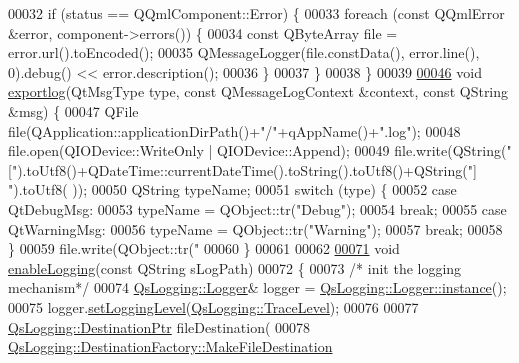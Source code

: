 \begin{DoxyCode}
00032     \textcolor{keywordflow}{if} (status == QQmlComponent::Error) \{
00033         \textcolor{keywordflow}{foreach} (\textcolor{keyword}{const} QQmlError &error, component->errors()) \{
00034             \textcolor{keyword}{const} QByteArray file = error.url().toEncoded();
00035             QMessageLogger(file.constData(), error.line(), 0).debug() << error.description();
00036         \}
00037     \}
00038 \}
00039 
\hypertarget{main_8cpp_source_l00046}{}\hyperlink{main_8cpp_a5e94203dceafb66df570cbbc79cb52bc}{00046} \textcolor{keywordtype}{void} \hyperlink{main_8cpp_a5e94203dceafb66df570cbbc79cb52bc}{exportlog}(QtMsgType type, \textcolor{keyword}{const} QMessageLogContext &context, \textcolor{keyword}{const} QString &msg) \{
00047     QFile file(QApplication::applicationDirPath()+\textcolor{stringliteral}{"/"}+qAppName()+\textcolor{stringliteral}{".log"});
00048     file.open(QIODevice::WriteOnly | QIODevice::Append);
00049     file.write(QString(\textcolor{stringliteral}{"["}).toUtf8()+QDateTime::currentDateTime().toString().toUtf8()+QString(\textcolor{stringliteral}{"] "}).toUtf8(
      ));
00050     QString typeName;
00051     \textcolor{keywordflow}{switch} (type) \{
00052     \textcolor{keywordflow}{case} QtDebugMsg:
00053         typeName = QObject::tr(\textcolor{stringliteral}{"Debug"});
00054         \textcolor{keywordflow}{break};
00055     \textcolor{keywordflow}{case} QtWarningMsg:
00056         typeName = QObject::tr(\textcolor{stringliteral}{"Warning"});
00057         \textcolor{keywordflow}{break};
00058     \}
00059     file.write(QObject::tr(\textcolor{stringliteral}{"%
00060 \}
00061 
00062 
\hypertarget{main_8cpp_source_l00071}{}\hyperlink{main_8cpp_ac3c79e35c4fc5c50939ae90485e1483f}{00071} \textcolor{keywordtype}{void} \hyperlink{main_8cpp_ac3c79e35c4fc5c50939ae90485e1483f}{enableLogging}(\textcolor{keyword}{const} QString sLogPath)
00072 \{
00073     \textcolor{comment}{/* init the logging mechanism*/}
00074     \hyperlink{classQsLogging_1_1Logger}{QsLogging::Logger}& logger = \hyperlink{classQsLogging_1_1Logger_a26fd3242d362eeeb3b38940a714ea6fa}{QsLogging::Logger::instance}();
00075     logger.\hyperlink{classQsLogging_1_1Logger_aa34d1a0d83e180f15e23a03f9de872c6}{setLoggingLevel}(\hyperlink{namespaceQsLogging_a38c7dd87e4de6f8eb460763ad0baa033a187ba10e2b3b400c6ee33afe6fc10915}{QsLogging::TraceLevel});
00076 
00077     \hyperlink{namespaceQsLogging_a8fe41cf859d617f1c23515f804d1e8ec}{QsLogging::DestinationPtr} fileDestination(
00078                 \hyperlink{classQsLogging_1_1DestinationFactory_abc128b6640d5716b91c681df960b878c}{QsLogging::DestinationFactory::MakeFileDestination}
}
\end{DoxyCode}
